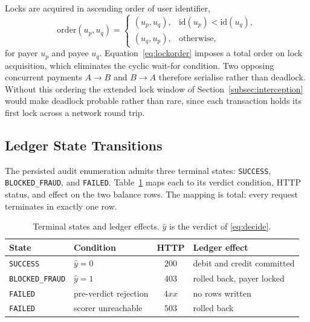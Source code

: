 \documentclass[conference]{IEEEtran}
\begin{document}
Locks are acquired in ascending order of user identifier,
\begin{equation}
\mathrm{order}(u_{p}, u_{q}) =
\begin{cases}
(u_{p}, u_{q}), & \mathrm{id}(u_{p}) < \mathrm{id}(u_{q}),\\[2pt]
(u_{q}, u_{p}), & \text{otherwise,}
\end{cases}
\label{eq:lockorder}
\end{equation}
for payer $u_{p}$ and payee $u_{q}$. Equation~\eqref{eq:lockorder}
imposes a total order on lock acquisition, which eliminates the cyclic
wait-for condition. Two opposing concurrent payments
$A\!\rightarrow\!B$ and $B\!\rightarrow\!A$ therefore serialise rather
than deadlock. Without this ordering the extended lock window of
Section~\ref{subsec:interception} would make deadlock probable rather
than rare, since each transaction holds its first lock across a network
round trip.

\subsection{Ledger State Transitions}
\label{subsec:states}

The persisted audit enumeration admits three terminal states:
\texttt{SUCCESS}, \texttt{BLOCKED\_FRAUD}, and \texttt{FAILED}.
Table~\ref{tab:states} maps each to its verdict condition, HTTP status,
and effect on the two balance rows. The mapping is total: every request
terminates in exactly one row.

\begin{table}[t]
\centering
\caption{Terminal states and ledger effects. $\hat{y}$ is the verdict
of \eqref{eq:decide}.}
\label{tab:states}
\renewcommand{\arraystretch}{1.25}
\footnotesize
\begin{tabular}{@{}llcl@{}}
\toprule
\textbf{State} & \textbf{Condition} & \textbf{HTTP} & \textbf{Ledger effect} \\
\midrule
\texttt{SUCCESS}        & $\hat{y}=0$           & $200$ & debit and credit committed \\
\texttt{BLOCKED\_FRAUD} & $\hat{y}=1$           & $403$ & rolled back, payer locked \\
\texttt{FAILED}         & pre-verdict rejection & $4xx$ & no rows written \\
\texttt{FAILED}         & scorer unreachable    & $503$ & rolled back \\
\bottomrule
\end{tabular}
\end{table}
\end{document}
